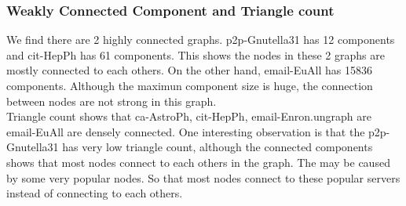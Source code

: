 
\subsubsection{Weakly Connected Component and Triangle count}

We find there are 2 highly connected graphs. p2p-Gnutella31 has 12 components and cit-HepPh has 61 components. This shows the nodes in these 2 graphs are mostly connected to each others.
On the other hand, email-EuAll has 15836 components. Although the maximun component size is huge, the connection between nodes are not strong in this graph.
\\
Triangle count shows that ca-AstroPh, cit-HepPh, email-Enron.ungraph are email-EuAll are densely connected. One interesting observation is that the p2p-Gnutella31 has very low triangle count, although the connected components shows that most nodes connect to each others in the graph. The may be caused by some very popular nodes. So that most nodes connect to these popular servers instead of connecting to each others.
\\
\\
\\
\\
\\
\
